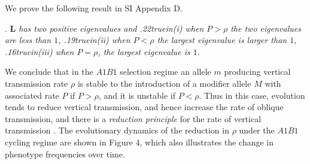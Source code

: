 \documentclass[9pt,twocolumn,twoside,lineno]{pnas-new}
\newcommand{\cl}{\mathbf{L}}
\newcommand{\ci}{\mathbf{I}}
\newcommand{\an}[1]{\begin{align}#1\end{align}}
\begin{document}
% 
We prove the following result in SI Appendix D.
\medskip
 
 . {\sl $\cl$ has two positive eigenvalues and\hfil\break
  {\hglue.22truein}(i) when $P>\rho$ the two eigenvalues are less than $1$,\hfil\break
  {\hglue.19truein}(ii) when $P<\rho$ the largest eigenvalue is larger than $1$,\hfil\break
  {\hglue.16truein}(iii) when $P=\rho$, the largest eigenvalue is $1$.}\par
  \medskip

 We conclude that in the $A1B1$ selection regime an allele $m$ producing vertical transmission rate $\rho$ is stable to the introduction of a modifier allele $M$ with associated rate $P$ if $P>\rho$, and it is unstable if $P<\rho$. Thus in this case, evolution tends to reduce vertical transmission, and hence increase the rate of oblique transmission,  and there is a {\sl reduction principle} for the rate of vertical transmission \cite{feldman1986evolutionary,altenberg2017unified}. The evolutionary dynamics of the reduction in $\rho$ under the $A1B1$ cycling regime are shown in Figure 4, which also illustrates the change in phenotype frequencies over time. 
 
\end{document}
